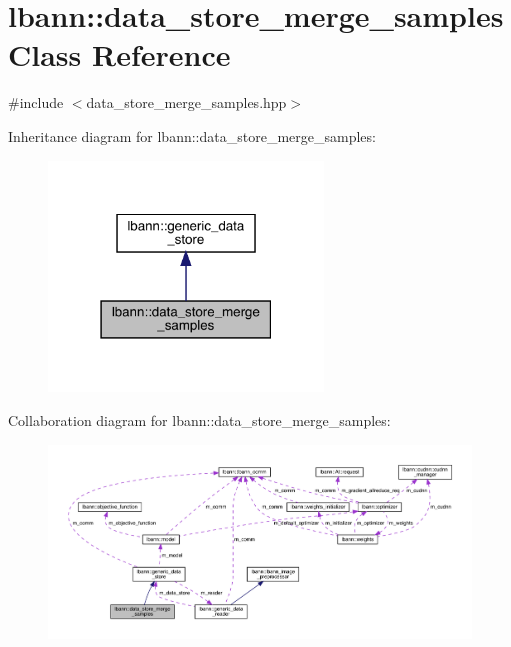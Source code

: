 \hypertarget{classlbann_1_1data__store__merge__samples}{}\section{lbann\+:\+:data\+\_\+store\+\_\+merge\+\_\+samples Class Reference}
\label{classlbann_1_1data__store__merge__samples}


{\ttfamily \#include $<$data\+\_\+store\+\_\+merge\+\_\+samples.\+hpp$>$}



Inheritance diagram for lbann\+:\+:data\+\_\+store\+\_\+merge\+\_\+samples\+:\nopagebreak
\begin{figure}[H]
\begin{center}
\leavevmode
\includegraphics[width=207pt]{classlbann_1_1data__store__merge__samples__inherit__graph}
\end{center}
\end{figure}


Collaboration diagram for lbann\+:\+:data\+\_\+store\+\_\+merge\+\_\+samples\+:\nopagebreak
\begin{figure}[H]
\begin{center}
\leavevmode
\includegraphics[width=350pt]{classlbann_1_1data__store__merge__samples__coll__graph}
\end{center}
\end{figure}
